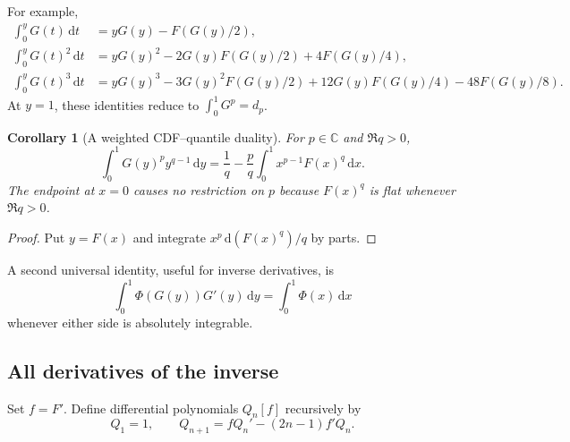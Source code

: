 \documentclass[11pt,oneside]{article}
\newtheorem{corollary}[theorem]{Corollary}
\theoremstyle{definition}
\theoremstyle{remark}
\newcommand{\C}{\mathbb C}
\newcommand{\dd}{\,\mathrm d}
\begin{document}
For example,
\begin{align}
 \int_0^yG(t)\dd t
 &=yG(y)-F(G(y)/2),\label{eq:inverse-primitive-p1}\\
 \int_0^yG(t)^2\dd t
 &=yG(y)^2-2G(y)F(G(y)/2)+4F(G(y)/4),\label{eq:inverse-primitive-p2}\\
 \int_0^yG(t)^3\dd t
 &=yG(y)^3-3G(y)^2F(G(y)/2)
 +12G(y)F(G(y)/4)-48F(G(y)/8).
\end{align}
At $y=1$, these identities reduce to $\int_0^1G^p=d_p$.

\begin{corollary}[A weighted CDF--quantile duality]\label{cor:weighted-quantile-duality}
For $p\in\C$ and $\Re q>0$,
\begin{equation}\label{eq:weighted-quantile-duality}
 \int_0^1G(y)^p y^{q-1}\dd y
 =\frac1q-\frac pq\int_0^1x^{p-1}F(x)^q\dd x.
\end{equation}
The endpoint at $x=0$ causes no restriction on $p$ because $F(x)^q$ is flat whenever $\Re q>0$.
\end{corollary}

\begin{proof}
Put $y=F(x)$ and integrate $x^p\dd(F(x)^q)/q$ by parts.
\end{proof}

A second universal identity, useful for inverse derivatives, is
\begin{equation}\label{eq:Gprime-pushforward}
 \int_0^1\Phi(G(y))G'(y)\dd y=\int_0^1\Phi(x)\dd x
\end{equation}
whenever either side is absolutely integrable.

\subsection{All derivatives of the inverse}

Set $f=F'$.  Define differential polynomials $Q_n[f]$ recursively by
\begin{equation}\label{eq:Q-recurrence}
 Q_1=1,
 \qquad
 Q_{n+1}=fQ_n'-(2n-1)f'Q_n.
\end{equation}
\end{document}
